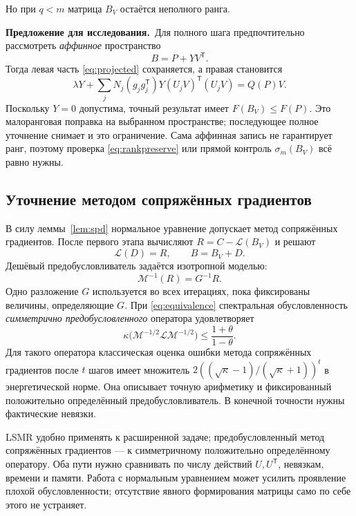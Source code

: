 \documentclass[11pt,a4paper]{article}
\numberwithin{equation}{section}
\theoremstyle{remark}
\newcommand{\T}{^{\mathsf T}}
\newcommand{\proposal}{\par\noindent\textbf{Предложение для исследования.}\ }
\begin{document}
Но при $q<m$ матрица $B_V$ остаётся неполного ранга.
\proposal Для полного шага предпочтительно рассмотреть
\emph{аффинное} пространство
\[
 B=P+YV\T.
\]
Тогда левая часть \eqref{eq:projected} сохраняется, а правая становится
\begin{equation}\label{eq:affine}
 \lambda Y+\sum_jN_j(g_jg_j\T)Y(U_jV)\T(U_jV)=Q(P)V.
\end{equation}
Поскольку $Y=0$ допустима, точный результат имеет $F(B_V)\le F(P)$.
Это малоранговая поправка на выбранном пространстве; последующее полное
уточнение снимает и это ограничение. Сама аффинная запись не гарантирует
ранг, поэтому проверка \eqref{eq:rankpreserve} или прямой контроль
$\sigma_m(B_V)$ всё равно нужны.

\subsection{Уточнение методом сопряжённых градиентов}
В силу леммы~\ref{lem:spd} нормальное уравнение допускает метод сопряжённых
градиентов. После первого этапа вычисляют $R=C-\mathcal L(B_V)$ и решают
\begin{equation}\label{eq:refine}
 \mathcal L(D)=R,\qquad B=B_V+D.
\end{equation}
Дешёвый предобусловливатель задаётся изотропной моделью:
\begin{equation}\label{eq:precondition}
 \mathcal M^{-1}(R)=G^{-1}R.
\end{equation}
Одно разложение $G$ используется во всех итерациях, пока фиксированы
величины, определяющие $G$. При \eqref{eq:equivalence} спектральная
обусловленность \emph{симметрично предобусловленного} оператора удовлетворяет
\begin{equation}\label{eq:condition}
 \kappa\bigl(\mathcal M^{-1/2}\mathcal L\mathcal M^{-1/2}\bigr)
 \le\frac{1+\theta}{1-\theta}.
\end{equation}
Для такого оператора классическая оценка ошибки метода сопряжённых
градиентов после $t$ шагов имеет множитель
$2((\sqrt\kappa-1)/(\sqrt\kappa+1))^t$ в энергетической норме.
Она описывает точную арифметику и фиксированный положительно определённый
предобусловливатель. В конечной точности нужны фактические невязки.

LSMR удобно применять к расширенной задаче; предобусловленный метод
сопряжённых градиентов --- к симметричному положительно определённому
оператору. Оба пути нужно сравнивать по числу действий $U,U\T$, невязкам,
времени и памяти. Работа с нормальным уравнением может усилить проявление
плохой обусловленности; отсутствие явного формирования матрицы само по
себе этого не устраняет.
\end{document}
